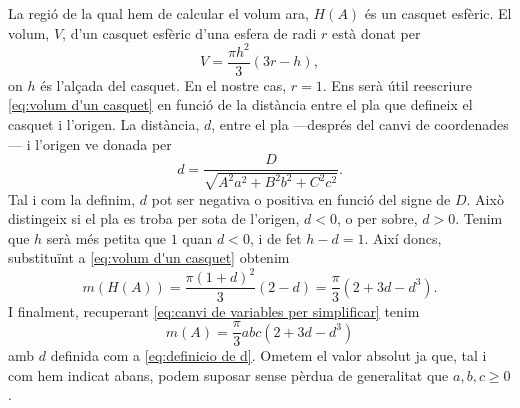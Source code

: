 La regió de la qual hem de calcular el volum ara, \( H(A) \) és un casquet esfèric. El volum, \( V \), d'un casquet esfèric d'una esfera de radi \( r \) està donat per
\begin{equation}
	V = \dfrac{\pi h^2}{3}(3r - h), \label{eq:volum d'un casquet}
\end{equation}
on \( h \) és l'alçada del casquet. En el nostre cas, \( r = 1 \). Ens serà útil reescriure \ref{eq:volum d'un casquet} en funció de la distància entre el pla que defineix el casquet i l'origen. La distància, \( d \), entre el pla ---després del canvi de coordenades---	i l'origen ve donada per 
\begin{equation}
	d = \dfrac{D}{\sqrt{A^2a^2 + B^2b^2 + C^2c^2}}. \label{eq:definicio de d}
\end{equation}
Tal i com la definim, \( d \) pot ser negativa o positiva en funció del signe de \( D \). Això distingeix si el pla es troba per sota de l'origen, \( d < 0 \), o per sobre, \( d > 0 \). Tenim que \( h \) serà més petita que \( 1 \) quan \( d < 0 \), i de fet \( h - d = 1 \). Així doncs, substituïnt a \ref{eq:volum d'un casquet} obtenim
\begin{equation}
	m(H(A)) = \dfrac{\pi(1 + d)^2}{3}(2 - d) = \dfrac{\pi}{3}\left(2 + 3d - d^3\right).
\end{equation}
I finalment, recuperant \ref{eq:canvi de variables per simplificar} tenim
\begin{equation}
	m(A) = \dfrac{\pi}{3}abc (2 + 3d - d^3)
\end{equation}
amb \( d \) definida com a \ref{eq:definicio de d}. Ometem el valor absolut ja que, tal i com hem indicat abans, podem suposar sense pèrdua de generalitat que \( a, b, c \geq 0 \).





